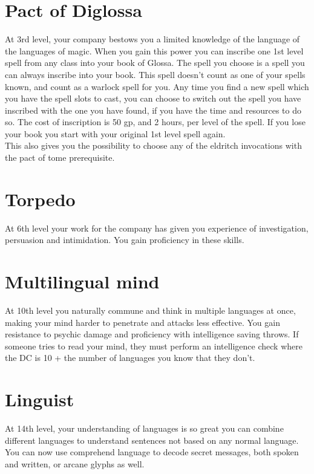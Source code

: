 \documentclass[11pt, A4paper, english]{article}
\begin{document}
	\section*{Pact of Diglossa}
At 3rd level, your company bestows you a limited knowledge of the language of the languages of magic. When you gain this power you can inscribe one 1st level spell from any class into your book of Glossa. The spell you choose is a spell you can always inscribe into your book. This spell doesn't count as one of your spells known, and count as a warlock spell for you. Any time you find a new spell which you have the spell slots to cast, you can choose to switch out the spell you have inscribed with the one you have found, if you have the time and resources to do so. The cost of inscription is 50 gp, and 2 hours, per level of the spell. If you lose your book you start with your original 1st level spell again. \\
This also gives you the possibility to choose any of the eldritch invocations with the pact of tome prerequisite.

	\section*{Torpedo}
At 6th level your work for the company has given you experience of investigation, persuasion and intimidation. You gain proficiency in these skills.
	
	\section*{Multilingual mind}
At 10th level you naturally commune and think in multiple languages at once, making your mind harder to penetrate and attacks less effective. You gain resistance to psychic damage and proficiency with intelligence saving throws. If someone tries to read your mind, they must perform an intelligence check where the DC is 10 + the number of languages you know that they don't.

	\section*{Linguist}
At 14th level, your understanding of languages is so great you can combine different languages to understand sentences not based on any normal language. You can now use comprehend language to decode secret messages, both spoken and written, or arcane glyphs as well.
\end{document}
